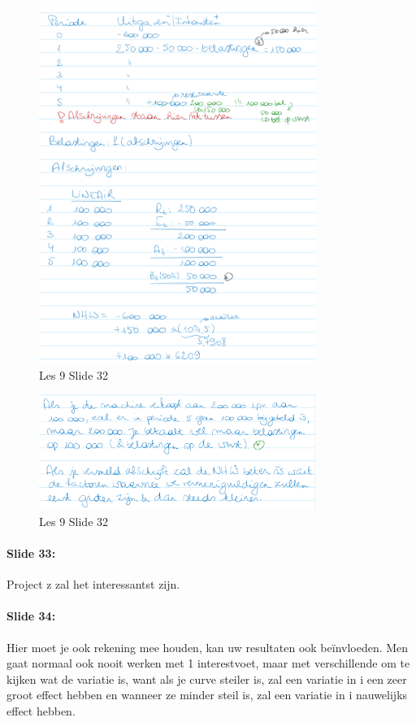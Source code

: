 \documentclass[10pt,a4paper]{report}
\begin{document}
\begin{figure}[h!]
\centering
\includegraphics[width=90mm]{Les09_04.png}
\caption{Les 9 Slide 32} 
\label{les09_04}
\end{figure}

\begin{figure}[h!]
\centering
\includegraphics[width=90mm]{Les09_05.png}
\caption{Les 9 Slide 32} 
\label{les09_05}
\end{figure}

\paragraph{Slide 33:} Project z zal het interessantst zijn.

\paragraph{Slide 34:} Hier moet je ook rekening mee houden, kan uw resultaten ook be\"invloeden. Men gaat normaal ook nooit werken met 1 interestvoet, maar met verschillende om te kijken wat de variatie is, want als je curve steiler is, zal een variatie in i een zeer groot effect hebben en wanneer ze minder steil is, zal een variatie in i nauwelijks effect hebben.
\end{document}
